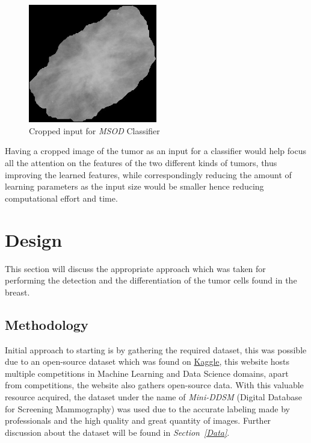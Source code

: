 \documentclass[12pt]{extarticle}
\begin{document}
	\begin{figure}[h]
		\centering
		\includegraphics[width=0.5\textwidth]{pics/Figures/cropped.jpg}
		\caption{\small{Cropped input for \emph{MSOD} Classifier}}
		\label{fig:cropped}
	\end{figure}
	Having a cropped image of the tumor as an input for a classifier would help focus all the attention on the features of the two different kinds of tumors, thus improving the learned features, while correspondingly reducing the amount of learning parameters as the input size would be smaller hence reducing computational effort and time. 
	
	\newpage
	\section{Design}
	This section will discuss the appropriate approach which was taken for performing the detection and the differentiation of the tumor cells found in the breast.
	
	
	\subsection{Methodology}
	Initial approach to starting is by gathering the required dataset, this was possible due to an open-source dataset which was found on \href{https://www.kaggle.com/}{Kaggle}, this website hosts multiple competitions in Machine Learning and Data Science domains, apart from competitions, the website also gathers open-source data. With this valuable resource acquired, the dataset under the name of \emph{Mini-DDSM} (Digital Database for Screening Mammography) \cite{Dataset} was used due to the accurate labeling made by professionals and the high quality and great quantity of images. Further discussion about the dataset will be found in \emph{Section~\ref{Data}}.
	
\end{document}
